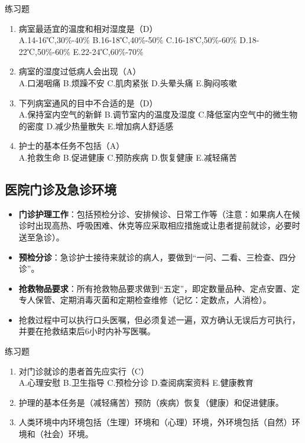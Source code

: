\documentclass[11pt, a4paper]{ctexart}
\begin{document}
\begin{examplebox}{练习题}
\begin{enumerate}
    \item 病室最适宜的温度和相对湿度是（D）\\
    A.14-16℃,30\%-40\% \quad B.16-18℃,40\%-50\% \quad C.16-18℃,50\%-60\% \quad D.18-22℃,50\%-60\% \quad E.22-24℃,60\%-70\%
    \item 病室的湿度过低病人会出现（A）\\
    A.口渴咽痛 \quad B.烦躁不安 \quad C.肌肉紧张 \quad D.头晕头痛 \quad E.胸闷咳嗽
    \item 下列病室通风的目中不合适的是（D）\\
    A.保持室内空气的新鲜 \quad B.调节室内的温度及湿度 \quad C.降低室内空气中的微生物的密度 \quad D.减少热量散失 \quad E.增加病人舒适感
    \item 护士的基本任务不包括（A）\\
    A.抢救生命 \quad B.促进健康 \quad C.预防疾病 \quad D.恢复健康 \quad E.减轻痛苦
\end{enumerate}
\end{examplebox}

\subsection{医院门诊及急诊环境}
\begin{itemize}
    \item \textbf{门诊护理工作}：包括预检分诊、安排候诊、日常工作等（注意：如果病人在候诊时出现高热、呼吸困难、休克等应采取相应措施或让患者提前就诊，必要时送至急诊）。
    \item \textbf{预检分诊}：急诊护士接待来就诊的病人，要做到“一问、二看、三检查、四分诊”。
    \item \textbf{抢救物品要求}：所有抢救物品要求做到“五定”，即定数量品种、定点安置、定专人保管、定期消毒灭菌和定期检查维修（记忆：定数点，人消检）。
    \item 抢救过程中可以执行口头医嘱，但必须复述一遍，双方确认无误后方可执行，并要在抢救结束后6小时内补写医嘱。
\end{itemize}

\begin{examplebox}{练习题}
\begin{enumerate}
    \item 对门诊就诊的患者首先应实行（C）\\
    A.心理安慰 \quad B.卫生指导 \quad C.预检分诊 \quad D.查阅病案资料 \quad E.健康教育
    \item 护理的基本任务是（减轻痛苦）预防（疾病）恢复（健康）和促进健康。
    \item 人类环境中内环境包括（生理）环境和（心理）环境，外环境包括（自然）环境和（社会）环境。
\end{enumerate}
\end{examplebox}
\end{document}
